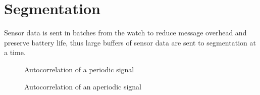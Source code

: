 \section{Segmentation}

Sensor data is sent in batches from the watch to reduce message overhead and preserve battery life, thus large buffers of sensor data are sent to segmentation at a time.

\begin{figure}
    \centering
    \caption{Autocorrelation of a periodic signal}
\end{figure}

\begin{figure}
    \centering
    \caption{Autocorrelation of an aperiodic signal}
\end{figure}

